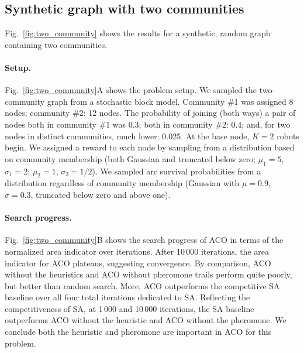 \documentclass[fleqn,10pt,lineno]{wlpeerj}
\begin{document}
  
\subsection{Synthetic graph with two communities}
Fig.~\ref{fig:two_community} shows the results for a synthetic, random graph containing two communities.

\paragraph{Setup.}
Fig.~\ref{fig:two_community}A shows the problem setup.
We sampled the two-community graph from a stochastic block model. Community \#1 was assigned 8 nodes; community \#2: 12 nodes.
The probability of joining (both ways) a pair of nodes both in community \#1 was 0.3; both in community \#2: 0.4; and, for two nodes in distinct communities, much lower: 0.025.
At the base node, $K=2$ robots begin.
We assigned a reward to each node by sampling from a distribution based on community membership (both Gaussian and truncated below zero; $\mu_1=5$, $\sigma_1=2$; $\mu_2=1$, $\sigma_2=1/2$).
We sampled arc survival probabilities from a distribution regardless of community membership (Gaussian with $\mu=0.9$, $\sigma=0.3$, truncated below zero and above one).


\paragraph{Search progress.}
Fig.~\ref{fig:two_community}B shows the search progress of ACO in terms of the normalized area indicator over iterations. After 10\,000 iterations, the area indicator for ACO plateaus, suggesting convergence. By comparison, ACO without the heuristics and ACO without pheromone trails perform quite poorly, but better than random search. 
More, ACO outperforms the competitive SA baseline over all four total iterations dedicated to SA.
Reflecting the competitiveness of SA, at 1\,000 and 10\,000 iterations, the SA baseline outperforms ACO without the heuristic and ACO without the pheromone.  
We conclude both the heuristic and pheromone are important in ACO for this problem.
\end{document}

